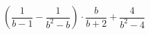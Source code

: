 \begin{ex}[type=expression]
	\begin{condition}
		\(\left( \dfrac{1}{b-1}-\dfrac{1}{b^2-b} \right)\cdot\dfrac{b}{b+2}+\dfrac{4}{b^2-4}\)
	\end{condition}
\end{ex}